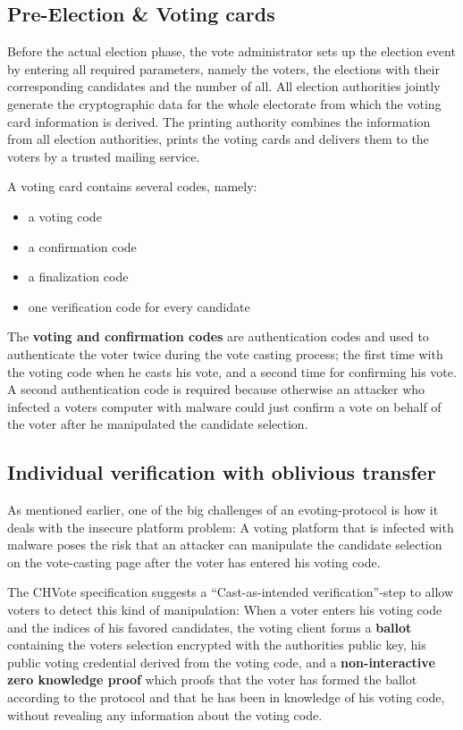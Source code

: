 \subsection{Pre-Election \& Voting cards}
Before the actual election phase, the vote administrator sets up the election event by entering all required parameters, namely the voters, the elections with their corresponding candidates and the number of all. All election authorities jointly generate the cryptographic data for the whole electorate from which the voting card information is derived. The printing authority combines the information from all election authorities, prints the voting cards and delivers them to the voters by a trusted mailing service. 

A voting card contains several codes, namely:

\begin{itemize}
	\item a voting code
	\item a confirmation code
	\item a finalization code
	\item one verification code for every candidate
\end{itemize}

The \textbf{voting and confirmation codes} are authentication codes and used to authenticate the voter twice during the vote casting process; the first time with the voting code when he casts his vote, and a second time for confirming his vote. A second authentication code is required because otherwise an attacker who infected a voters computer with malware could just confirm a vote on behalf of the voter after he manipulated the candidate selection. 

\subsection{Individual verification with oblivious transfer}
As mentioned earlier, one of the big challenges of an evoting-protocol is how it deals with the insecure platform problem: A voting platform that is infected with malware poses the risk that an attacker can manipulate the candidate selection on the vote-casting page after the voter has entered his voting code. 

The CHVote specification suggests a "`Cast-as-intended verification"'-step to allow voters to detect this kind of manipulation: When a voter enters his voting code and the indices of his favored candidates, the voting client forms a \textbf{ballot} containing the voters selection encrypted with the authorities public key, his public voting credential derived from the voting code, and a \textbf{non-interactive zero knowledge proof} which proofs that the voter has formed the ballot according to the protocol and that he has been in knowledge of his voting code, without revealing any information about the voting code.


